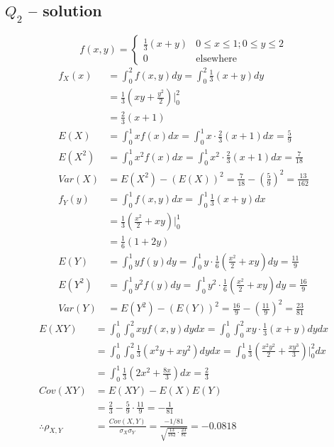 \documentclass[12pt,a4paper, fleq]{article}
\begin{document}
\subsection*{$Q_{2}$ -- solution}
\[
f(x,y) =
\begin{cases}
\frac13 (x+y) & 0 \le x \le 1; 0\le y \le 2\\
0 & \mbox{elsewhere}
\end{cases}
\]
\[
\begin{split}
f_X(x) & = \int_0^2 f(x,y)dy = \int_0^2 \frac13(x+y)dy\\ %
& = \frac 13(xy + \frac{y^2}{2})\Big\rvert_0^2\\
 & = \frac23(x+1)\\[5mm]
E(X) &= \int_0^1 xf(x)dx = \int_0^1 x\cdot\frac 23(x+1)dx = \frac 59\\[2mm]
E(X^2) & = \int_0^1 x^2f(x)dx = \int_0^1 x^2 \cdot \frac 23(x+1)dx = \frac{7}{18}\\[2mm]
Var(X) & = E(X^2) - \left(E(X)\right)^2 = \frac{7}{18} - \left(\frac59\right)^2 = \frac{13}{162}\\[5mm]
f_Y(y) & = \int_0^1 f(x,y)dx = \int_0^1 \frac13(x+y)dx\\ %
& = \frac 13(\frac{x^2}{2}+ xy)\Big\rvert_0^1\\
 & = \frac16(1 +2y)\\[5mm]
E(Y) &= \int_0^1 yf(y)dy = \int_0^1 y\cdot\frac 16\left(\frac{x^2}{2}+ xy\right)\!dy = \frac{11}{9}\\[2mm]
E(Y^2) & = \int_0^1 y^2f(y)dy = \int_0^1 y^2\cdot\frac 16\left(\frac{x^2}{2}+ xy\right)\!dy = \frac{16}{9}\\[2mm]
Var(Y) & = E(Y^2) - \left(E(Y)\right)^2 = \frac{16}{9} - \left(\frac{11}{9}\right)^2 = \frac{23}{81}
\end{split}
\]
\[
\begin{split}
E(XY) & = \int_0^1\int_0^2 xyf(x,y)dydx = \int_0^1\int_0^2  xy\cdot\frac13(x+y)dydx\\[2mm] %
&= \int_0^1\int_0^2\frac13(x^2y+xy^2)dydx = \int_0^1\frac13\left(\frac{x^2y^2}{2} + \frac{xy^3}{3}\right)\!\Bigg\rvert_0^2\!dx\\[2mm]
& = \int_0^1 \frac13 (2x^2 + \frac{8x}{3})dx = \frac23\\[5mm]
Cov(XY) & = E(XY) - E(X)E(Y)\\
& = \frac23 - \frac59 \cdot \frac{11}{9} = -\frac{1}{81}\\[5mm]
\therefore \rho_{X,Y}& = \frac{Cov(X,Y)}{\sigma_X\sigma_Y} = \frac{-1/81}{\sqrt{\frac{13}{162}\cdot \frac{23}{81}}} = \mathbf{-0.0818}
\end{split}
\]
\end{document}
